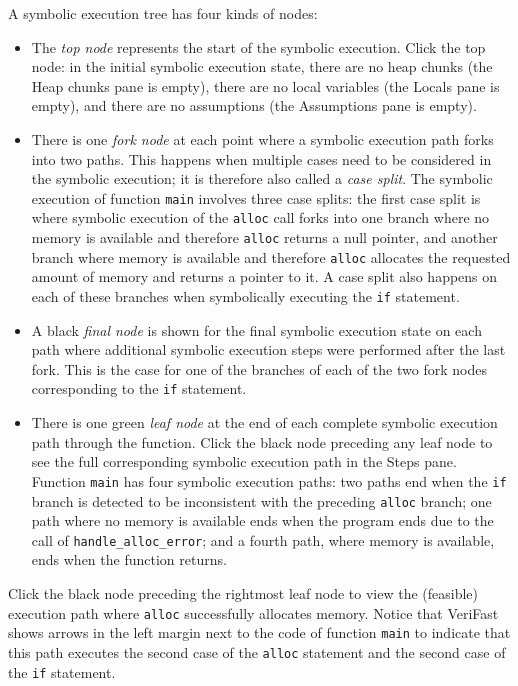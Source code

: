 \documentclass{article}
\begin{document}
A symbolic execution tree has four kinds of nodes:
\begin{itemize}
\item The \emph{top node} represents the start of the symbolic execution. Click the top node: in the initial symbolic execution state, there are no heap chunks (the Heap chunks pane is empty), there are no local variables (the Locals pane is empty), and there are no assumptions (the Assumptions pane is empty).
\item There is one \emph{fork node} at each point where a symbolic execution path forks into two paths. This happens when multiple cases need to be considered in the symbolic execution; it is therefore also called a \emph{case split}. The symbolic execution of function \lstinline|main| involves three case splits: the first case split is where symbolic execution of the \lstinline|alloc| call forks into one branch where no memory is available and therefore \lstinline|alloc| returns a null pointer, and another branch where memory is available and therefore \lstinline|alloc| allocates the requested amount of memory and returns a pointer to it. A case split also happens on each of these branches when symbolically executing the \lstinline|if| statement.
\item A black \emph{final node} is shown for the final symbolic execution state on each path where additional symbolic execution steps were performed after the last fork. This is the case for one of the branches of each of the two fork nodes corresponding to the \lstinline|if| statement.
\item There is one green \emph{leaf node} at the end of each complete symbolic execution path through the function. Click the black node preceding any leaf node to see the full corresponding symbolic execution path in the Steps pane.
Function \lstinline|main| has four symbolic execution paths: two paths end when the \lstinline|if| branch is detected to be inconsistent with the preceding \lstinline|alloc| branch; one path where no memory is available ends when the program ends due to the call of \lstinline|handle_alloc_error|; and a fourth path, where memory is available, ends when the function returns.
\end{itemize}

Click the black node preceding the rightmost leaf node to view the (feasible) execution path where \lstinline|alloc| successfully allocates memory. Notice that VeriFast shows arrows in the left margin next to the code of function \lstinline|main| to indicate that this path executes the second case of the \lstinline|alloc| statement and the second case of the \lstinline|if| statement.
\end{document}
